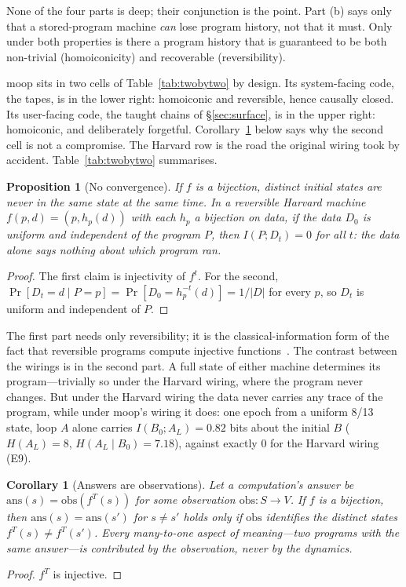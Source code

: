 \documentclass[11pt]{article}
\newtheorem{proposition}[theorem]{Proposition}
\newtheorem{corollary}[theorem]{Corollary}
\theoremstyle{definition}
\theoremstyle{remark}
\newcommand{\moop}{\textsf{moop}}
\begin{document}
None of the four parts is deep; their conjunction is the point. Part (b)
says only that a stored-program machine \emph{can} lose program history,
not that it must. Only under both properties is there a program history
that is guaranteed to be both non-trivial (homoiconicity) and recoverable
(reversibility).

\moop{} sits in two cells of Table~\ref{tab:twobytwo} by design. Its
system-facing code, the tapes, is in the lower right: homoiconic and
reversible, hence causally closed. Its user-facing code, the taught
chains of \S\ref{sec:surface}, is in the upper right: homoiconic, and
deliberately forgetful. Corollary~\ref{cor:answers} below says why the
second cell is not a compromise. The Harvard row is the road the
original wiring took by accident.
Table~\ref{tab:twobytwo} summarises.

\begin{proposition}[No convergence]
\label{prop:noconvergence}
If $f$ is a bijection, distinct initial states are never in the same
state at the same time. In a reversible Harvard machine
$f(p,d)=(p,h_p(d))$ with each $h_p$ a bijection on data, if the data
$D_0$ is uniform and independent of the program $P$, then $I(P;D_t)=0$
for all $t$: the data alone says nothing about which program ran.
\end{proposition}
\begin{proof}
The first claim is injectivity of $f^t$. For the second,
$\Pr[D_t=d\mid P=p]=\Pr[D_0=h_p^{-t}(d)]=1/|D|$ for every $p$, so $D_t$ is
uniform and independent of $P$.
\end{proof}

The first part needs only reversibility; it is the
classical-information form of the fact that reversible programs compute
injective functions~\cite{axelsen2011}. The contrast between the wirings
is in the second part. A full state of either machine determines its
program---trivially so under the Harvard wiring, where the program never
changes. But under the Harvard wiring the data never carries any trace
of the program, while under \moop{}'s wiring it does: one epoch from a
uniform 8/13 state, loop $A$ alone carries $I(B_0;A_L)=0.82$ bits about
the initial $B$ ($H(A_L)=8$, $H(A_L\mid B_0)=7.18$), against exactly 0
for the Harvard wiring (E9).

\begin{corollary}[Answers are observations]
\label{cor:answers}
Let a computation's answer be $\mathrm{ans}(s)=\mathrm{obs}(f^T(s))$ for
some observation $\mathrm{obs}:S\to V$. If $f$ is a bijection, then
$\mathrm{ans}(s)=\mathrm{ans}(s')$ for $s\ne s'$ holds only if
$\mathrm{obs}$ identifies the distinct states $f^T(s)\ne f^T(s')$. Every
many-to-one aspect of meaning---two programs with the same answer---is
contributed by the observation, never by the dynamics.
\end{corollary}
\begin{proof}
$f^T$ is injective.
\end{proof}
\end{document}
